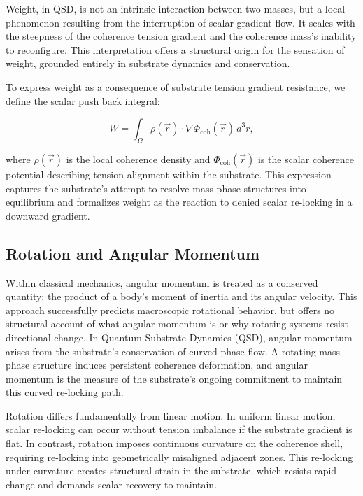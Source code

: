 \documentclass[entropy,article,submit,pdftex,moreauthors]{Definitions/mdpi}
\begin{document}
Weight, in QSD, is not an intrinsic interaction between two masses, but a local phenomenon resulting from the interruption of scalar gradient flow. It scales with the steepness of the coherence tension gradient and the coherence mass’s inability to reconfigure. This interpretation offers a structural origin for the sensation of weight, grounded entirely in substrate dynamics and conservation.

To express weight as a consequence of substrate tension gradient resistance, we define the scalar push back integral:

\begin{equation}
    W = \int_{\Omega} \rho(\vec{r}) \cdot \nabla \Phi_{\text{coh}}(\vec{r}) \, d^3r,
\end{equation}

where \( \rho(\vec{r}) \) is the local coherence density and \( \Phi_{\text{coh}}(\vec{r}) \) is the scalar coherence potential describing tension alignment within the substrate. This expression captures the substrate’s attempt to resolve mass-phase structures into equilibrium and formalizes weight as the reaction to denied scalar re-locking in a downward gradient.

\subsection{Rotation and Angular Momentum}

Within classical mechanics, angular momentum is treated as a conserved quantity: the product of a body’s moment of inertia and its angular velocity. This approach successfully predicts macroscopic rotational behavior, but offers no structural account of what angular momentum is or why rotating systems resist directional change. In Quantum Substrate Dynamics (QSD), angular momentum arises from the substrate’s conservation of curved phase flow. A rotating mass-phase structure induces persistent coherence deformation, and angular momentum is the measure of the substrate’s ongoing commitment to maintain this curved re-locking path.

Rotation differs fundamentally from linear motion. In uniform linear motion, scalar re-locking can occur without tension imbalance if the substrate gradient is flat. In contrast, rotation imposes continuous curvature on the coherence shell, requiring re-locking into geometrically misaligned adjacent zones. This re-locking under curvature creates structural strain in the substrate, which resists rapid change and demands scalar recovery to maintain.
\end{document}
